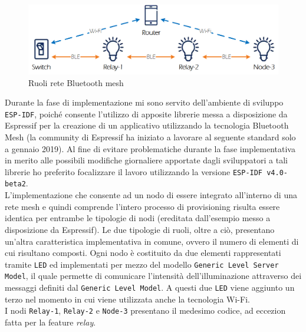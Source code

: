 \begin{figure}[!ht]
    \centering
    \includegraphics[width = \textwidth]{images/nodi_mesh.png}
    \caption{Ruoli rete Bluetooth mesh}
    \label{fig:ruoli_rete_mesh}
\end{figure}

\noindent Durante la fase di implementazione mi sono servito dell'ambiente di sviluppo \texttt{ESP-IDF}, poiché consente l'utilizzo di apposite librerie messa a disposizione da Espressif per la creazione di un applicativo utilizzando la tecnologia Bluetooth Mesh (la community di Espressif ha iniziato a lavorare al seguente standard solo a gennaio 2019). Al fine di evitare problematiche durante la fase implementativa in merito alle possibili modifiche giornaliere apportate dagli sviluppatori a tali librerie ho preferito focalizzare il lavoro utilizzando la versione \texttt{ESP-IDF v4.0-beta2}.\\ 

\noindent L'implementazione che consente ad un nodo di essere integrato all'interno di una rete mesh e quindi comprende l'intero processo di provisioning risulta essere identica per entrambe le tipologie di nodi (ereditata dall'esempio messo a disposizione da Espressif). Le due tipologie di ruoli, oltre a ciò, presentano un'altra caratteristica implementativa in comune, ovvero il numero di elementi di cui risultano composti. Ogni nodo è costituito da due elementi rappresentati tramite \texttt{LED} ed implementati per mezzo del modello \texttt{Generic Level Server Model}, il quale permette di comunicare l'intensità dell'illuminazione attraverso dei messaggi definiti dal \texttt{Generic Level Model}. A questi due \texttt{LED} viene aggiunto un terzo nel momento in cui viene utilizzata anche la tecnologia Wi-Fi.\\
I nodi \texttt{Relay-1}, \texttt{Relay-2} e \texttt{Node-3} presentano il medesimo codice, ad eccezion fatta per la feature \textit{relay}.\\

